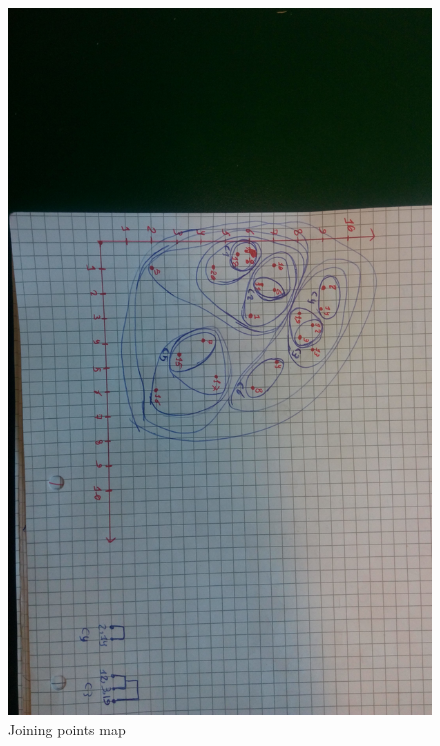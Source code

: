 \documentclass{article}
\begin{document}
\begin{figure}[H]
\includegraphics[angle=90,scale=0.25,trim={10cm 30cm 10cm 30cm},clip]{complete_link.jpg}
\caption{Joining points map}
\end{figure}
\end{document}
